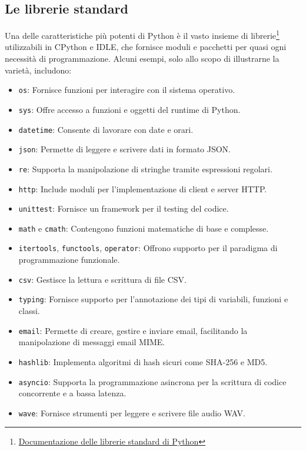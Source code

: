 \documentclass[
  letterpaper,
  DIV=11,
  numbers=noendperiod]{scrreprt}
\providecommand{\tightlist}{%
  \setlength{\itemsep}{0pt}\setlength{\parskip}{0pt}}\usepackage{longtable,booktabs,array}
\begin{document}
\subsection{Le librerie standard}\label{le-librerie-standard}

Una delle caratteristiche più potenti di Python è il vasto insieme di
librerie\footnote{\href{https://docs.python.org/3/library/index.html}{Documentazione
  delle librerie standard di Python}} utilizzabili in CPython e IDLE,
che fornisce moduli e pacchetti per quasi ogni necessità di
programmazione. Alcuni esempi, solo allo scopo di illustrarne la
varietà, includono:

\begin{itemize}
\tightlist
\item
  \texttt{os}: Fornisce funzioni per interagire con il sistema
  operativo.
\item
  \texttt{sys}: Offre accesso a funzioni e oggetti del runtime di
  Python.
\item
  \texttt{datetime}: Consente di lavorare con date e orari.
\item
  \texttt{json}: Permette di leggere e scrivere dati in formato JSON.
\item
  \texttt{re}: Supporta la manipolazione di stringhe tramite espressioni
  regolari.
\item
  \texttt{http}: Include moduli per l'implementazione di client e server
  HTTP.
\item
  \texttt{unittest}: Fornisce un framework per il testing del codice.
\item
  \texttt{math} e \texttt{cmath}: Contengono funzioni matematiche di
  base e complesse.
\item
  \texttt{itertools}, \texttt{functools}, \texttt{operator}: Offrono
  supporto per il paradigma di programmazione funzionale.
\item
  \texttt{csv}: Gestisce la lettura e scrittura di file CSV.
\item
  \texttt{typing}: Fornisce supporto per l'annotazione dei tipi di
  variabili, funzioni e classi.
\item
  \texttt{email}: Permette di creare, gestire e inviare email,
  facilitando la manipolazione di messaggi email MIME.
\item
  \texttt{hashlib}: Implementa algoritmi di hash sicuri come SHA-256 e
  MD5.
\item
  \texttt{asyncio}: Supporta la programmazione asincrona per la
  scrittura di codice concorrente e a bassa latenza.
\item
  \texttt{wave}: Fornisce strumenti per leggere e scrivere file audio
  WAV.
\end{itemize}
\end{document}
